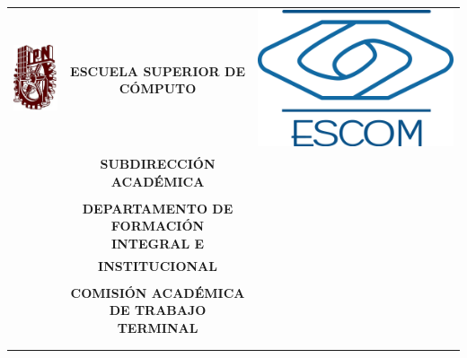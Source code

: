 \newpage
\begin{titlepage}
    \begin{center}
    \begin{tabular}{r c l}

    \includegraphics[scale=.20]{images/ipn} & \small \textbf{ESCUELA SUPERIOR DE C\'OMPUTO}& \includegraphics[scale=.20]{images/escom}\\ 
    &\small \textbf{SUBDIRECCI\'ON ACAD\'EMICA} \\\\
    &\small \textbf{DEPARTAMENTO DE FORMACI\'ON INTEGRAL E}\\
    &\small \textbf{INSTITUCIONAL}\\\\
    &\small \textbf{COMISI\'ON ACAD\'EMICA DE TRABAJO TERMINAL }\\\\\\
    \end{tabular}
    \end{center}



\end{titlepage}
